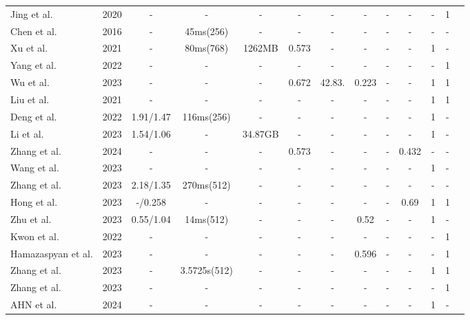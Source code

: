\documentclass[preprint,12pt]{elsarticle}
\begin{document}
\begin{table}[t]
{\begin{tabular}{lcccccccccccc}
                Jing et al.\citep{41jing2020dynamic} & 2020 & - & - & - & - & - & - & - & - & - & 1 \\
                Chen et al.\citep{43chen2016fast} & 2016 &- & 45ms(256) & - & - & - & - & - & - & - & -\\
                Xu et al.\citep{44xu2021drb} & 2021 &- & 80ms(768) & 1262MB & 0.573 & - & - & - & - & 1 & -\\
                Yang et al.\citep{45yang2022pastiche} & 2022 &- & - & - & - & - & - & - & - & - & 1\\
                Wu et al.\citep{47wu2023preserving} & 2023 &- & - & - & 0.672 & 42.83. & 0.223 & - & - & 1 & 1\\
                Liu et al.\citep{48liu2021adaattn} & 2021 &- & - & - & - & - & - & - & - & 1 & 1\\
                Deng et al.\citep{49deng2022stytr2} & 2022 &1.91/1.47 & 116ms(256) & - & - & - & - & - & - & 1 & -\\
                Li et al.\citep{50li2023compact} & 2023 &1.54/1.06 & - & 34.87GB & - & - & - & - & - & 1 & -\\
                Zhang et al.\citep{51zhang2024rethink} & 2024 &- & - & - & 0.573 & - & - & - & 0.432 & - & -\\
                Wang et al.\citep{52wang2023interactive} & 2023 &- & - & - & - & - & - & - & - & 1 & -\\
                Zhang et al.\citep{53zhang2023edge} & 2023 &2.18/1.35 & 270ms(512) & - & - & - & - & - & - & - & -\\
                Hong et al.\citep{54hong2023aespa} & 2023 &-/0.258 & - & - & - & - & - & - & 0.69 & 1 & 1\\
                Zhu et al.\citep{55zhu2023all} & 2023 &0.55/1.04 & 14ms(512) & - & - & - & 0.52 & - & - & 1 & -\\
                Kwon et al.\citep{57kwon2022clipstyler} & 2022 &- & - & - & - & - & - & - & - & - & 1\\
                Hamazaspyan et al.\citep{59hamazaspyan2023diffusion} & 2023 &- & - & - & - & - & 0.596 & - & - & - & 1\\
                Zhang et al.\citep{60zhang2024artbank} & 2023 &- & 3.5725s(512) & - & - & - & - & - & - & 1 & 1\\
                Zhang et al.\citep{62zhang2023inversion} & 2023 &- & - & - & - & - & - & - & - & - & 1\\
                AHN et al.\citep{63ahn2024dreamstyler} & 2024 &- & - & - & - & - & - & - & - & 1 & -\\

\end{tabular}}
\end{table}
\end{document}
